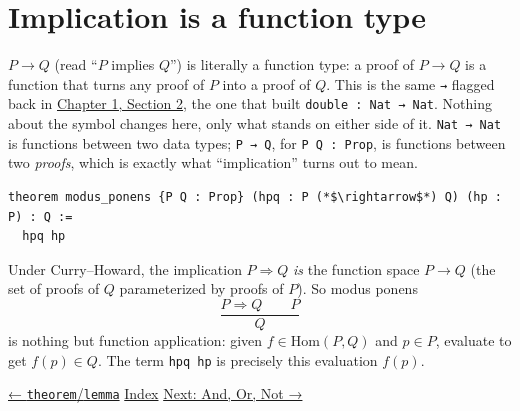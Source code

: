 \section{Implication is a function type}\label{sec:03-propositions-and-proofs:04-implication:1}

\(P \to Q\) (read ``\(P\) implies \(Q\)'') is literally a function type: a proof of \(P \to Q\) is a function that turns any proof of \(P\) into a proof of \(Q\). This is the same \texttt{→} flagged back in \hyperref[sec:01-basics:02-def-let-implicit:1]{Chapter 1, Section 2}, the one that built \texttt{double : Nat → Nat}. Nothing about the symbol changes here, only what stands on either side of it. \texttt{Nat → Nat} is functions between two data types; \texttt{P → Q}, for \texttt{P Q : Prop}, is functions between two \emph{proofs}, which is exactly what ``implication'' turns out to mean.

\begin{lstlisting}
theorem modus_ponens {P Q : Prop} (hpq : P (*$\rightarrow$*) Q) (hp : P) : Q :=
  hpq hp
\end{lstlisting}

\begin{mathreading}

Under Curry--Howard, the implication \(P \Rightarrow Q\) \emph{is} the function space \(P \to Q\) (the set of proofs of \(Q\) parameterized by proofs of \(P\)). So modus ponens \[
\frac{P \Rightarrow Q \qquad P}{Q}
\] is nothing but function application: given \(f \in \mathrm{Hom}(P, Q)\) and \(p \in P\), evaluate to get \(f(p) \in Q\). The term \texttt{hpq hp} is precisely this evaluation \(f(p)\).

\end{mathreading}

\hyperref[sec:03-propositions-and-proofs:03-theorem-lemma:1]{← \texttt{theorem}/\texttt{lemma}} \textbar{} \hyperref[sec:03-propositions-and-proofs:00-index:1]{Index} \textbar{} \hyperref[sec:03-propositions-and-proofs:05-and-or-not:1]{Next: And, Or, Not →}
